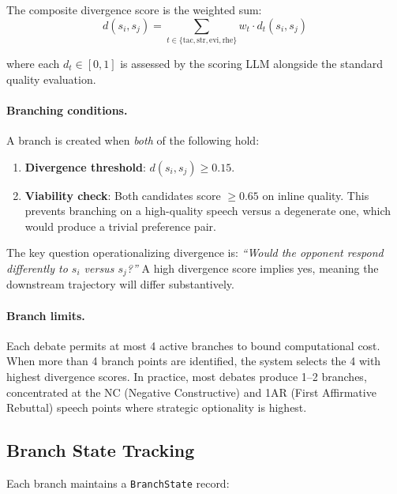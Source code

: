 The composite divergence score is the weighted sum:
\begin{equation}
d(s_i, s_j) = \sum_{t \in \{\text{tac}, \text{str}, \text{evi}, \text{rhe}\}} w_t \cdot d_t(s_i, s_j)
\end{equation}

\noindent where each $d_t \in [0, 1]$ is assessed by the scoring LLM
alongside the standard quality evaluation.

\paragraph{Branching conditions.}
A branch is created when \emph{both} of the following hold:

\begin{enumerate}
\item \textbf{Divergence threshold}: $d(s_i, s_j) \geq 0.15$.
\item \textbf{Viability check}: Both candidates score $\geq 0.65$ on inline quality. This prevents branching on a high-quality speech versus a degenerate one, which would produce a trivial preference pair.
\end{enumerate}

The key question operationalizing divergence is: \emph{``Would the opponent
respond differently to $s_i$ versus $s_j$?''} A high divergence score
implies yes, meaning the downstream trajectory will differ substantively.

\paragraph{Branch limits.}
Each debate permits at most 4 active branches to bound computational cost.
When more than 4 branch points are identified, the system selects the
4 with highest divergence scores. In practice, most debates produce 1--2
branches, concentrated at the NC (Negative Constructive) and 1AR
(First Affirmative Rebuttal) speech points where strategic optionality
is highest.

\subsection{Branch State Tracking}

Each branch maintains a \texttt{BranchState} record:

